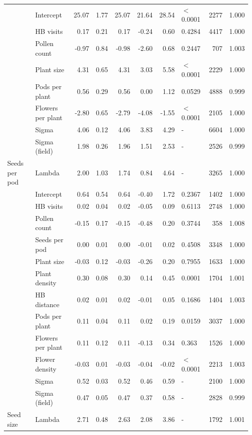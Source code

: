 \documentclass[12pt]{article} %
\begin{document}
\begin{longtable}{l|l|r|r|r|r|r|l|r|r}
\cline{1-10}
 & Intercept & 25.07 & 1.77 & 25.07 & 21.64 & 28.54 & $<$0.0001 & 2277 & 1.000\\
\cline{2-10}
 & HB visits & 0.17 & 0.21 & 0.17 & -0.24 & 0.60 & 0.4284 & 4417 & 1.000\\
\cline{2-10}
 & Pollen count & -0.97 & 0.84 & -0.98 & -2.60 & 0.68 & 0.2447 & 707 & 1.003\\
\cline{2-10}
 & Plant size & 4.31 & 0.65 & 4.31 & 3.03 & 5.58 & $<$0.0001 & 2229 & 1.000\\
\cline{2-10}
 & Pods per plant & 0.56 & 0.29 & 0.56 & 0.00 & 1.12 & 0.0529 & 4888 & 0.999\\
\cline{2-10}
 & Flowers per plant & -2.80 & 0.65 & -2.79 & -4.08 & -1.55 & $<$0.0001 & 2105 & 1.000\\
\cline{2-10}
 & Sigma & 4.06 & 0.12 & 4.06 & 3.83 & 4.29 & - & 6604 & 1.000\\
\cline{2-10}
 & Sigma (field) & 1.98 & 0.26 & 1.96 & 1.51 & 2.53 & - & 2526 & 0.999\\
\cline{2-10}
\multirow{-9}{*}{\raggedright\arraybackslash Seeds per pod} & Lambda & 2.00 & 1.03 & 1.74 & 0.84 & 4.64 & - & 3265 & 1.000\\
\cline{1-10}
 & Intercept & 0.64 & 0.54 & 0.64 & -0.40 & 1.72 & 0.2367 & 1402 & 1.000\\
\cline{2-10}
 & HB visits & 0.02 & 0.04 & 0.02 & -0.05 & 0.09 & 0.6113 & 2748 & 1.000\\
\cline{2-10}
 & Pollen count & -0.15 & 0.17 & -0.15 & -0.48 & 0.20 & 0.3744 & 358 & 1.008\\
\cline{2-10}
 & Seeds per pod & 0.00 & 0.01 & 0.00 & -0.01 & 0.02 & 0.4508 & 3348 & 1.000\\
\cline{2-10}
 & Plant size & -0.03 & 0.12 & -0.03 & -0.26 & 0.20 & 0.7955 & 1633 & 1.000\\
\cline{2-10}
 & Plant density & 0.30 & 0.08 & 0.30 & 0.14 & 0.45 & 0.0001 & 1704 & 1.001\\
\cline{2-10}
 & HB distance & 0.02 & 0.01 & 0.02 & -0.01 & 0.05 & 0.1686 & 1404 & 1.003\\
\cline{2-10}
 & Pods per plant & 0.11 & 0.04 & 0.11 & 0.02 & 0.19 & 0.0159 & 3037 & 1.000\\
\cline{2-10}
 & Flowers per plant & 0.11 & 0.12 & 0.11 & -0.13 & 0.34 & 0.363 & 1526 & 1.000\\
\cline{2-10}
 & Flower density & -0.03 & 0.01 & -0.03 & -0.04 & -0.02 & $<$0.0001 & 2213 & 1.003\\
\cline{2-10}
 & Sigma & 0.52 & 0.03 & 0.52 & 0.46 & 0.59 & - & 2100 & 1.000\\
\cline{2-10}
 & Sigma (field) & 0.47 & 0.05 & 0.47 & 0.37 & 0.58 & - & 2828 & 0.999\\
\cline{2-10}
\multirow{-13}{*}{\raggedright\arraybackslash Seed size} & Lambda & 2.71 & 0.48 & 2.63 & 2.08 & 3.86 & - & 1792 & 1.001\\
\hline
\end{longtable}
\endgroup{}
\end{document}
